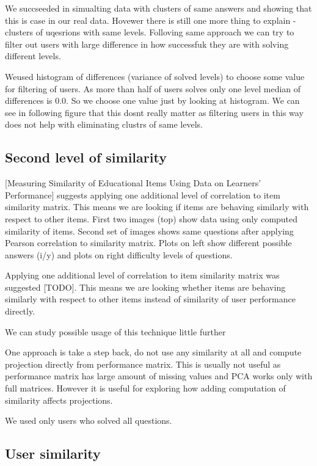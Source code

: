 \documentclass[
  digital, %
  table,   %
  nolof,     %
  nolot,     %
  nocover
]{fithesis3}
\begin{document}
We succseeded in simualting data with clusters of same answers and
showing that this is case in our real data. Hovewer there is still one
more thing to explain - clusters of uqesrions with same levels.
Folloving same approach we can try to filter out users with large
difference in how successfuk they are with solving different levels.

Weused histogram of differences (variance of solved levels) to choose
some value for filtering of users. As more than half of users solves
only one level median of differences is 0.0. So we choose one value just
by looking at histogram. We can see in following figure that this dosnt
really matter as filtering users in this way does not help with
eliminating clustrs of same levels.


\subsection{Second level of
similarity}\label{second-level-of-similarity}

{[}Measuring Similarity of Educational Items Using Data on Learners'
Performance{]} suggests applying one additional level of correlation to
item similarity matrix. This means we are looking if items are behaving
similarly with respect to other items. First two images (top) show data
using only computed similarity of items. Second set of images shows same
questions after applying Pearson correlation to similarity matrix. Plots
on left show different possible answers (i/y) and plots on right
difficulty levels of questions.

Applying one additional level of correlation to item similarity matrix
was suggested {[}TODO{]}. This means we are looking whether items are
behaving similarly with respect to other items instead of similarity of
user performance directly.

We can study possible usage of this technique little further

One approach is take a step back, do not use any similarity at all and
compute projection directly from performance matrix. This is usually not
useful as performance matrix has large amount of missing values and PCA
works only with full matrices. However it is useful for exploring how
adding computation of similarity affects projections.

We used only users who solved all questions.

\subsection{User similarity}\label{user-similarity}
\end{document}

